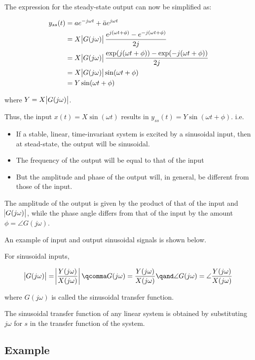 \documentclass[
  14pt,
  a4paper,
  oneside,
  open=any,
  a4paper,
  14pt]{report}
\providecommand{\tightlist}{%
  \setlength{\itemsep}{0pt}\setlength{\parskip}{0pt}}\usepackage{longtable,booktabs,array}
\begin{document}
The expression for the steady-state output can now be simplified as:

\[
\begin{aligned}
    y_{ss}(t) &= ae^{-j\omega t} + \bar{a}e^{j\omega t} \\
    &= X\abs{G(j\omega)}\dfrac{e^{j(\omega t + \phi)}-e^{-j(\omega t + \phi)}}{\complexnum[output-complex-root=j]{2j}} \\
    &= X\abs{G(j\omega)}\dfrac{\exp(j(\omega t + \phi))-\exp(-j(\omega t + \phi))}{\complexnum[output-complex-root=j]{2j}} \\
    &= X\abs{G(j\omega)} \sin(\omega t + \phi)\\
    &= Y \sin(\omega t + \phi)
\end{aligned}
\]

where \(Y = X\abs{G(j\omega)}\).

Thus, the input \(x(t) = X \sin(\omega t)\) results in
\(y_{ss}(t) = Y \sin(\omega t + \phi)\). i.e.

\begin{itemize}
\tightlist
\item
  If a stable, linear, time-invariant system is excited by a sinusoidal
  input, then at stead-state, the output will be sinusoidal.
\item
  The frequency of the output will be equal to that of the input
\item
  But the amplitude and phase of the output will, in general, be
  different from those of the input.
\end{itemize}

The amplitude of the output is given by the product of that of the input
and \(\abs{G(j\omega)}\), while the phase angle differs from that of the
input by the amount \(\phi = \angle G(j\omega)\).

An example of input and output sinusoidal signals is shown below.

For sinusoidal inputs,

\[
    \abs{G(j\omega)} = \abs{\dfrac{Y(j\omega)}{X(j\omega)}}\qcomma G(j\omega) = \dfrac{Y(j\omega)}{X(j\omega)} \qand \angle G(j\omega) = \angle \dfrac{Y(j\omega)}{X(j\omega)}
\]

where \(G(j\omega)\) is called the sinusoidal transfer function.

The sinusoidal transfer function of any linear system is obtained by
substituting \(j\omega\) for \(s\) in the transfer function of the
system.

\subsection{Example}\label{example-5}
\end{document}
